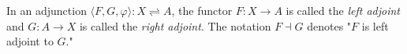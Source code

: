 In an adjunction $\langle F, G, \varphi \rangle: X \rightleftharpoons A$, the functor $F: X \to A$ is called the \emph{left adjoint} and $G: A \to X$ is called the \emph{right adjoint}. The notation $F \dashv G$ denotes "$F$ is left adjoint to $G$."

